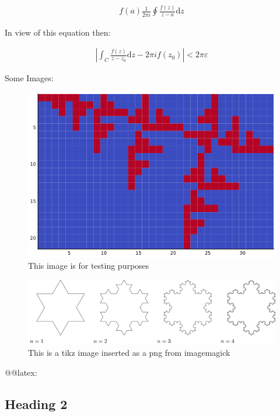 \documentclass[11pt]{article}
\begin{document}
\begin{align}
f\left( a \right) \frac{1}{2\pi i} \oint \frac{f\left( z \right)}{z- a}\mathrm{d}z
\end{align}

In view of this equation then: \cite{zhangMakingEigenvectorBasedReputation2004}

$$\begin{aligned}
\left| \int_C \frac{f\left( z \right)}{z- z_0} \mathrm{d}z - 2 \pi i f\left( z_0 \right) \right|<2 \pi \varepsilon
\end{aligned}$$

Some Images: \cite{ngStableAlgorithmsLink2001}

\begin{figure}[htbp]
\centering
\includegraphics[width=12cm]{media/my-self-rep-frac.png}
\caption{\label{testim}This image is for testing purposes \cite{moskowitzLibraryGuidesWikipedia}}
\end{figure}

\begin{figure}[htbp]
\centering
\includegraphics[width=12cm]{media/tikz/Snowflake.png}
\caption{\label{testtikzins}This is a tikz image inserted as a png from imagemagick}
\end{figure}


@@latex: 



\subsection{Heading 2}
\label{heading-2}
\end{document}

